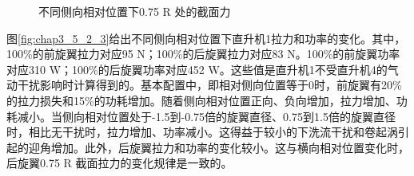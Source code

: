 \begin{figure}[!htb]
  \centering
  \quad
  \caption{不同侧向相对位置下0.75 R 处的截面力}
  \label{fig:chap3_5_2_2}
\end{figure}

图\ref{fig:chap3_5_2_3}给出不同侧向相对位置下直升机1拉力和功率的变化。其中，100\%的前旋翼拉力对应95 N；100\%的后旋翼拉力对应83 N。100\%的前旋翼功率对应310 W；100\%的后旋翼功率对应452 W。这些值是直升机1不受直升机4的气动干扰影响时计算得到的。基本配置中，即相对侧向位置等于0时，前旋翼有20\%的拉力损失和15\%的功耗增加。随着侧向相对位置正向、负向增加，拉力增加、功耗减小。当侧向相对位置处于-1.5到-0.75倍的旋翼直径、0.75到1.5倍的旋翼直径时，相比无干扰时，拉力增加、功率减小。这得益于较小的下洗流干扰和卷起涡引起的迎角增加。此外，后旋翼拉力和功率的变化较小。这与横向相对位置变化时，后旋翼0.75 R 截面拉力的变化规律是一致的。

